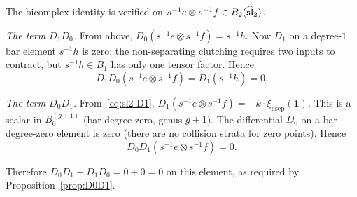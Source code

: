 \begin{verification}[Bicomplex relation $D_0 D_1 + D_1 D_0 = 0$
for $\slhat_2$]
\label{ver:sl2-bicomplex}
The bicomplex identity is verified on
$s^{-1}e \otimes s^{-1}f \in B_2(\widehat{\mathfrak{sl}}_2)$.

\medskip\noindent
\emph{The term $D_1 D_0$.}
From above, $D_0(s^{-1}e \otimes s^{-1}f) = s^{-1}h$.
Now $D_1$ on a degree-$1$ bar element $s^{-1}h$ is zero:
the non-separating clutching requires two inputs to contract,
but $s^{-1}h \in B_1$ has only one tensor factor. Hence
\[
 D_1 D_0(s^{-1}e \otimes s^{-1}f) = D_1(s^{-1}h) = 0.
\]

\medskip\noindent
\emph{The term $D_0 D_1$.}
From~\eqref{eq:sl2-D1},
$D_1(s^{-1}e \otimes s^{-1}f)
= -k \cdot \xi_{\mathrm{nsep}}(\mathbf{1})$.
This is a scalar in $B_0^{(g+1)}$ (bar degree zero, genus $g+1$).
The differential $D_0$ on a bar-degree-zero element is zero
(there are no collision strata for zero points). Hence
\[
 D_0 D_1(s^{-1}e \otimes s^{-1}f) = 0.
\]

\medskip\noindent
Therefore $D_0 D_1 + D_1 D_0 = 0 + 0 = 0$ on this element,
as required by Proposition~\ref{prop:D0D1}.
\end{verification}

